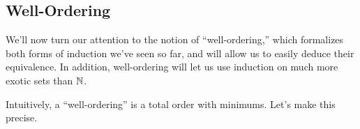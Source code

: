 \documentclass[../main.tex]{subfiles}
\begin{document}
\subsection{Well-Ordering}
We'll now turn our attention to the notion of ``well-ordering,'' which formalizes both forms of induction we've seen so far, and will allow us to easily deduce their equivalence. In addition, well-ordering will let us use induction on much more exotic sets than $\mathbb N$.

Intuitively, a ``well-ordering'' is a total order with minimums. Let's make this precise.
\end{document}
